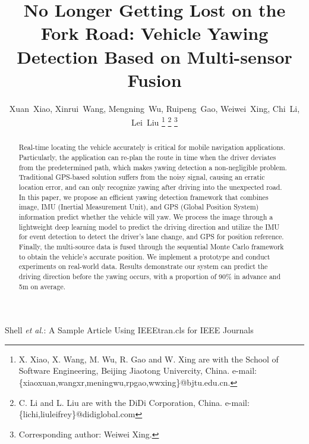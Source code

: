 \documentclass[journal]{IEEEtran}
\begin{document}
\title{No Longer Getting Lost on the Fork Road: Vehicle Yawing Detection Based on Multi-sensor Fusion}

\author{Xuan~Xiao, Xinrui~Wang, Mengning~Wu,
Ruipeng~Gao,
Weiwei~Xing,
Chi~Li,
Lei~Liu
\thanks{X. Xiao, X. Wang, M. Wu, R. Gao and W. Xing are with the School of Software Engineering, Beijing Jiaotong Univercity, China. e-mail:\{xiaoxuan,wangxr,meningwu,rpgao,wwxing\}@bjtu.edu.cn.}%
\thanks{C. Li and L. Liu are with the DiDi Corporation, China. e-mail:\{lichi,liuleifrey\}@didiglobal.com}%
\thanks{Corresponding author: Weiwei Xing.}}

%
{Shell \MakeLowercase{\textit{et al.}}: A Sample Article Using IEEEtran.cls for IEEE Journals}


\maketitle

\begin{abstract}
  Real-time locating the vehicle accurately is critical for mobile navigation applications. Particularly, the application can re-plan the route in time when the driver deviates from the predetermined path, which makes yawing detection a non-negligible problem.
  Traditional GPS-based solution suffers from the noisy signal, causing an erratic location error, and can only recognize yawing after driving into the unexpected road.
  In this paper, we propose an efficient yawing detection framework that combines image, IMU (Inertial Measurement Unit), and GPS (Global Position System) information predict whether the vehicle will yaw. 
  We process the image through a lightweight deep learning model to predict the driving direction and utilize the IMU for event detection to detect the driver's lane change, and GPS for position reference.
  Finally, the multi-source data is fused through the sequential Monte Carlo framework to obtain the vehicle's accurate position.
  We implement a prototype and conduct experiments on real-world data. Results demonstrate our system can predict the driving direction before the yawing occurs, with a proportion of 90\% in advance and 5m on average.
\end{abstract}
\end{document}
